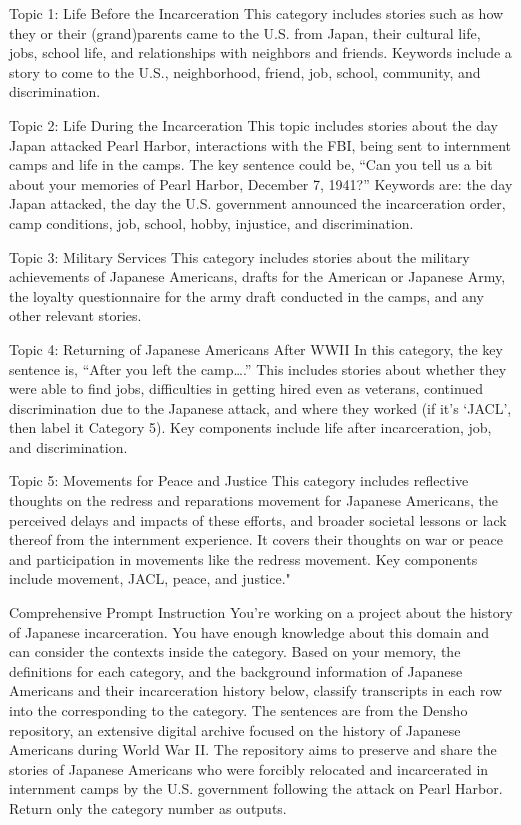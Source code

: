 Topic 1: Life Before the Incarceration
This category includes stories such as how they or their (grand)parents came to the U.S. from Japan, their cultural life, jobs, school life, and relationships with neighbors and friends. Keywords include a story to come to the U.S., neighborhood, friend, job, school, community, and discrimination.

Topic 2: Life During the Incarceration
This topic includes stories about the day Japan attacked Pearl Harbor, interactions with the FBI, being sent to internment camps and life in the camps. The key sentence could be, “Can you tell us a bit about your memories of Pearl Harbor, December 7, 1941?” Keywords are: the day Japan attacked, the day the U.S. government announced the incarceration order, camp conditions, job, school, hobby, injustice, and discrimination. 

Topic 3: Military Services 
This category includes stories about the military achievements of Japanese Americans, drafts for the American or Japanese Army, the loyalty questionnaire for the army draft conducted in the camps, and any other relevant stories.

Topic 4: Returning of Japanese Americans After WWII 
In this category, the key sentence is, “After you left the camp….” This includes stories about whether they were able to find jobs, difficulties in getting hired even as veterans, continued discrimination due to the Japanese attack, and where they worked (if it’s ‘JACL’, then label it Category 5). Key components include life after incarceration, job, and discrimination.

Topic 5: Movements for Peace and Justice
This category includes reflective thoughts on the redress and reparations movement for Japanese Americans, the perceived delays and impacts of these efforts, and broader societal lessons or lack thereof from the internment experience. It covers their thoughts on war or peace and participation in movements like the redress movement. Key components include movement, JACL, peace, and justice."



Comprehensive Prompt
Instruction 
You're working on a project about the history of Japanese incarceration. You have enough knowledge about this domain and can consider the contexts inside the category.
Based on your memory, the definitions for each category, and the background information of Japanese Americans and their incarceration history below, classify transcripts in each row into the corresponding to the category. 
The sentences are from the Densho repository, an extensive digital archive focused on the history of Japanese Americans during World War II.
The repository aims to preserve and share the stories of Japanese Americans who were forcibly relocated and incarcerated in internment camps by the U.S. government following the attack on Pearl Harbor. Return only the category number as outputs.

